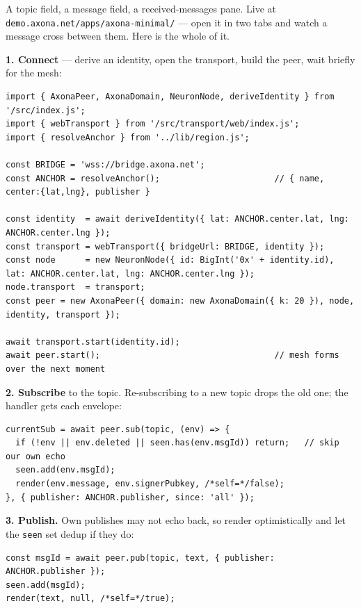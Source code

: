 \documentclass[nobib]{tufte-handout}
\begin{document}
A topic field, a message field, a received-messages pane. Live at
\texttt{demo.axona.net/apps/axona-minimal/} --- open it in two tabs and watch a
message cross between them. Here is the whole of it.

\textbf{1. Connect} --- derive an identity, open the transport, build the peer,
wait briefly for the mesh:

\begin{fullwidth}
\begin{lstlisting}
import { AxonaPeer, AxonaDomain, NeuronNode, deriveIdentity } from '/src/index.js';
import { webTransport } from '/src/transport/web/index.js';
import { resolveAnchor } from '../lib/region.js';

const BRIDGE = 'wss://bridge.axona.net';
const ANCHOR = resolveAnchor();                       // { name, center:{lat,lng}, publisher }

const identity  = await deriveIdentity({ lat: ANCHOR.center.lat, lng: ANCHOR.center.lng });
const transport = webTransport({ bridgeUrl: BRIDGE, identity });
const node      = new NeuronNode({ id: BigInt('0x' + identity.id), lat: ANCHOR.center.lat, lng: ANCHOR.center.lng });
node.transport  = transport;
const peer = new AxonaPeer({ domain: new AxonaDomain({ k: 20 }), node, identity, transport });

await transport.start(identity.id);
await peer.start();                                   // mesh forms over the next moment
\end{lstlisting}
\end{fullwidth}

\textbf{2. Subscribe} to the topic. Re-subscribing to a new topic drops the old
one; the handler gets each envelope:

\begin{fullwidth}
\begin{lstlisting}
currentSub = await peer.sub(topic, (env) => {
  if (!env || env.deleted || seen.has(env.msgId)) return;   // skip our own echo
  seen.add(env.msgId);
  render(env.message, env.signerPubkey, /*self=*/false);
}, { publisher: ANCHOR.publisher, since: 'all' });
\end{lstlisting}
\end{fullwidth}

\textbf{3. Publish.} Own publishes may not echo back, so render optimistically
and let the \texttt{seen} set dedup if they do:

\begin{fullwidth}
\begin{lstlisting}
const msgId = await peer.pub(topic, text, { publisher: ANCHOR.publisher });
seen.add(msgId);
render(text, null, /*self=*/true);
\end{lstlisting}
\end{fullwidth}
\end{document}
